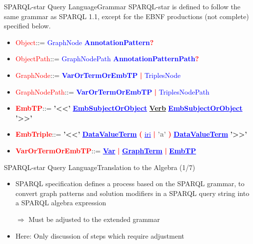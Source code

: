 \documentclass[aspectratio=169]{beamer}
\begin{document}
\begin{frame}{SPARQL-star Query Language}{Grammar}
    SPARQL-star is defined to follow the same grammar as SPARQL 1.1, except for the EBNF productions (not complete) specified below.
    \begin{itemize}
        \item \textcolor{red}{Object}\quad::= \textcolor{blue}{GraphNode} \textcolor{blue}{\textbf{AnnotationPattern}}\textcolor{red}{\textbf{?}}
        \item \textcolor{red}{ObjectPath}\quad::= \textcolor{blue}{GraphNodePath} \textcolor{blue}{\textbf{AnnotationPatternPath}}\textcolor{red}{\textbf{?}}
        \item \textcolor{red}{GraphNode}\quad::= \textcolor{blue}{\textbf{VarOrTermOrEmbTP}} \textcolor{red}{\textbf{|}} \textcolor{blue}{TriplesNode}
        \item \textcolor{red}{GraphNodePath}\quad::= \textcolor{blue}{\textbf{VarOrTermOrEmbTP}} \textcolor{red}{\textbf{|}} \textcolor{blue}{TriplesNodePath}
        \item \textcolor{red}{\textbf{EmbTP}}\quad\quad\quad::= \textbf{'<<'} \textcolor{blue}{\textbf{\underline{EmbSubjectOrObject}}} \textbf{\underline{Verb}} \textcolor{blue}{\textbf{\underline{EmbSubjectOrObject}}} \textbf{'>>'}
        \item \textcolor{red}{\textbf{EmbTriple}}\quad\quad\quad::= \textbf{'<<'} \textcolor{blue}{\textbf{\underline{DataValueTerm}}} \textcolor{red}{\textbf{(}} \textcolor{blue}{\underline{iri}} \textcolor{red}{\textbf{|}} \textcolor{gray}{\textbf{'a'}} \textcolor{red}{\textbf{)}} \textcolor{blue}{\textbf{\underline{DataValueTerm}}} \textbf{'>>'}
        \item \textcolor{red}{\textbf{VarOrTermOrEmbTP}}\quad\quad\quad::= \textcolor{blue}{\underline{\textbf{Var}}} \textcolor{red}{\textbf{|}} \textcolor{blue}{\underline{\textbf{GraphTerm}}} \textcolor{red}{\textbf{|}} \textcolor{blue}{\textbf{\underline{EmbTP}}}
    \end{itemize}
\end{frame}

\begin{frame}{SPARQL-star Query Language}{Translation to the Algebra (1/7)}
    \begin{itemize}
        \item SPARQL specification defines a process based on the SPARQL grammar, to convert graph patterns and solution modifiers in a SPARQL query string into a SPARQL algebra expression
        \item[$\Rightarrow$] Must be adjusted to the extended grammar
        \item Here: Only discussion of steps which require adjustment
    \end{itemize}
\end{frame}
\end{document}
